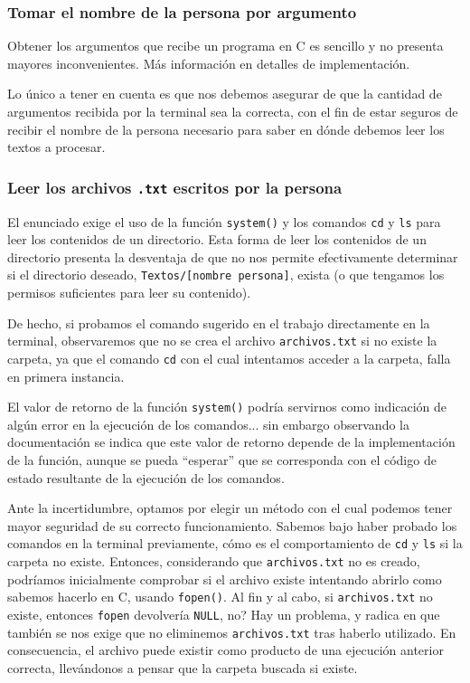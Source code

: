 \documentclass[a4paper]{article}
\begin{document}
\subsubsection{Tomar el nombre de la persona por argumento}

Obtener los argumentos que recibe un programa en C es sencillo y no presenta mayores inconvenientes. Más información en detalles de implementación.

Lo único a tener en cuenta es que nos debemos asegurar de que la cantidad de argumentos recibida por la terminal sea la correcta, con el fin de estar seguros de recibir el nombre de la persona necesario para saber en dónde debemos leer los textos a procesar.

\subsubsection{Leer los archivos \texttt{.txt} escritos por la persona}

El enunciado exige el uso de la función \texttt{system()} y los comandos \texttt{cd} y \texttt{ls} para leer los contenidos de un directorio. Esta forma de leer los contenidos de un directorio presenta la desventaja de que no nos permite efectivamente determinar si el directorio deseado, \texttt{Textos/[nombre persona]}, exista (o que tengamos los permisos suficientes para leer su contenido).

De hecho, si probamos el comando sugerido en el trabajo directamente en la terminal, observaremos que no se crea el archivo \texttt{archivos.txt} si no existe la carpeta, ya que el comando \texttt{cd} con el cual intentamos acceder a la carpeta, falla en primera instancia.

El valor de retorno de la función \texttt{system()} podría servirnos como indicación de algún error en la ejecución de los comandos... sin embargo observando la documentación se indica que este valor de retorno depende de la implementación de la función, aunque se pueda ``esperar'' que se corresponda con el código de estado resultante de la ejecución de los comandos\cite{SystemRefC}.

Ante la incertidumbre, optamos por elegir un método con el cual podemos tener mayor seguridad de su correcto funcionamiento. Sabemos bajo haber probado los comandos en la terminal previamente, cómo es el comportamiento de \texttt{cd} y \texttt{ls} si la carpeta no existe. Entonces, considerando que \texttt{archivos.txt} no es creado, podríamos inicialmente comprobar si el archivo existe intentando abrirlo como sabemos hacerlo en C, usando \texttt{fopen()}. Al fin y al cabo, si \texttt{archivos.txt} no existe, entonces \texttt{fopen} devolvería \texttt{NULL}, no? Hay un problema, y radica en que también se nos exige que no eliminemos \texttt{archivos.txt} tras haberlo utilizado. En consecuencia, el archivo puede existir como producto de una ejecución anterior correcta, llevándonos a pensar que la carpeta buscada si existe.
\end{document}
